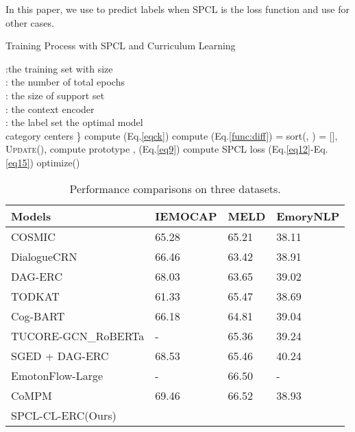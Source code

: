 \documentclass[11pt]{article}
\begin{document}
In this paper,  we use  to predict labels when SPCL is the loss function and use  for other cases.

\begin{algorithm}[t]
\caption{Training Process with SPCL and Curriculum Learning}
\begin{algorithmic}[1]
\REQUIRE
:the training set with size \\
: the number of total epochs\\
: the size of support set \\
: the context encoder \\
: the label set
\ENSURE the optimal model \\
category centers 
    \STATE \}
    \STATE compute  (Eq.\ref{eqck})
    \STATE compute  (Eq.\ref{func:diff})
    \STATE  = sort(, )
    \STATE 
    \STATE 
    \STATE 
    \STATE 
    \STATE  = [],
    \FOR{}
        \STATE U\textsc{pdate}(), 
        \STATE 
        \STATE compute prototype ,  (Eq.\ref{eq9})
        \STATE compute SPCL loss (Eq.\ref{eq12}-Eq.\ref{eq15})
        \STATE optimize()
    \ENDFOR
\ENDFOR
\RETURN  
\end{algorithmic}
\label{alg1}
\end{algorithm}



\begin{table*}[h]
\centering
\begin{tabular}{l|C{2cm}|C{2cm}|C{2cm}}
\hline
Models              & IEMOCAP        & MELD           & EmoryNLP       \\ \hline
COSMIC\cite{ghosal2020cosmic}              & 65.28          & 65.21          & 38.11          \\ \hline
DialogueCRN \cite{hu2021dialoguecrn}         & 66.46          & 63.42          & 38.91          \\ \hline
DAG-ERC \cite{shen2021directed}             & 68.03          & 63.65          & 39.02          \\ \hline
TODKAT \cite{zhu2021topic}             & 61.33          & 65.47          & 38.69          \\ \hline
Cog-BART \cite{li2021contrast}            & 66.18          & 64.81          & 39.04          \\ \hline
TUCORE-GCN\_RoBERTa\cite{lee2021graph} & -                  &  65.36          & 39.24        \\ \hline
SGED + DAG-ERC\cite{ijcai2022p562}      & 68.53          & 65.46          & 40.24          \\ \hline
EmotonFlow-Large \cite{song2022emotionflow}    & -              & 66.50          & -              \\ \hline
CoMPM \cite{lee2021compm}               & 69.46          & 66.52          & 38.93          \\ \hline
 \hline
SPCL-CL-ERC(Ours)       &  &  &  \\ \hline
\end{tabular}
\caption{Performance comparisons on three datasets.}
\label{tab:main}
\end{table*}
\end{document}
